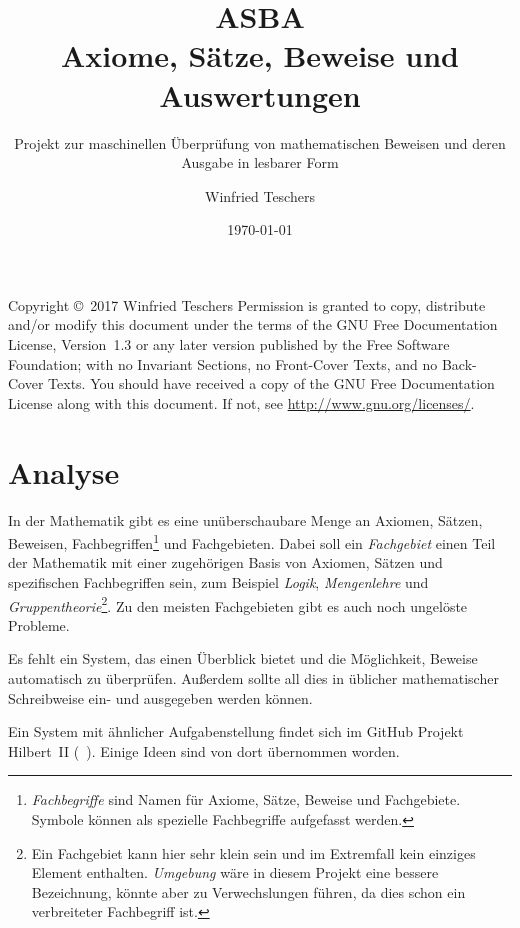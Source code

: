\documentclass[english,ngerman,parskip=half,headsepline,footsepline]{scrreprt}
\title{{\Huge ASBA}\\Axiome, Sätze, Beweise und Auswertungen}
\subtitle{Projekt zur maschinellen Überprüfung von mathematischen Beweisen und deren Ausgabe in lesbarer Form}
\author{Winfried Teschers}
\date{\today}
\newcommand*{\texthead}[1]{\textnormal{\textsf{\textbf{#1}}}}
\newcommand*{\newchapter}[1]{
	\markboth{#1}{}
	\ohead{\texthead{ASBA}}
	\chead{\texthead{#1}}
	\ihead{\texthead{\chaptername~\thechapter}}
	\thispagestyle{scrheadings}
}
\begin{document}
	\maketitle
	\tableofcontents
	\ohead{\texthead{ASBA}}
	\chead{\texthead{\contentsname}}
	\ihead{}
	\thispagestyle{scrheadings}
	\vfill
	Copyright \copyright\ 2017 Winfried Teschers
	\bigskip
	Permission is granted to copy, distribute and/or modify this document under the terms of the GNU Free Documentation License, Version~1.3 or any later version published by the Free Software Foundation; with no Invariant Sections, no Front-Cover Texts, and no Back-Cover Texts. You should have received a copy of the GNU Free Documentation License along with this document.  If not, see \url{http://www.gnu.org/licenses/}.

	\cleardoublepage
	\chapter{Analyse} %
	\label{cha:Analyse}
	\newchapter{Analyse}

	In der Mathematik gibt es eine unüberschaubare Menge an Axiomen, Sätzen, Beweisen, Fachbegriffen\footnote{\emph{Fachbegriffe} sind Namen für Axiome, Sätze, Beweise und Fachgebiete. Symbole können als spezielle Fachbegriffe aufgefasst werden.} und Fachgebieten. Dabei soll ein \emph{Fachgebiet} einen Teil der Mathematik mit einer zugehörigen Basis von Axiomen, Sätzen und spezifischen Fachbegriffen sein, zum Beispiel \emph{Logik}, \emph{Mengenlehre} und \emph{Gruppentheorie}\footnote{Ein Fachgebiet kann hier sehr klein sein und im Extremfall kein einziges Element enthalten. \emph{Umgebung} wäre in diesem Projekt eine bessere Bezeichnung, könnte aber zu Verwechslungen führen, da dies schon ein verbreiteter Fachbegriff ist.}. Zu den meisten Fachgebieten gibt es auch noch ungelöste Probleme.

	Es fehlt ein System, das einen Überblick bietet und die Möglichkeit, Beweise automatisch zu überprüfen. Außerdem sollte all dies in üblicher mathematischer Schreibweise ein- und ausgegeben werden können.

	Ein System mit ähnlicher Aufgabenstellung findet sich im GitHub Projekt Hilbert~II (\seename~\cite{bib:HilbertII, bib:qedeq}). Einige Ideen sind von dort übernommen worden.
\end{document}
